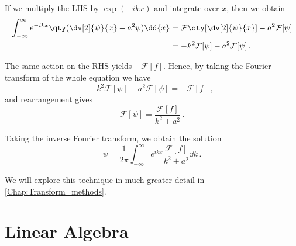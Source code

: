 \documentclass{article}
\theoremstyle{plain}\theoremheaderfont{\normalfont\itshape}\theorembodyfont{\rmfamily}\theoremseparator{.}\newtheorem*{rem}{Remark}\newtheorem*{ex}{Example}\newtheorem*{proof}{Proof}\newtheorem*{altp}{Alternative proof}
\theoremstyle{plain}\theoremheaderfont{\normalfont\bfseries}\theorembodyfont{\rmfamily}\theoremseparator{.}\newtheorem{thm}{Theorem}[section]\newtheorem{lem}[thm]{Lemma}\newtheorem{prop}[thm]{Proposition}\newtheorem*{cor}{Corollary}\newtheorem{defn}[thm]{Definition}\newtheorem{clm}[thm]{Claim}\newtheorem{clminproof}{Claim}
\theoremstyle{break}\theoremheaderfont{\normalfont\itshape}\theorembodyfont{\rmfamily}\theoremseparator{.\medskip}\newtheorem*{proofskip}{Proof}\newtheorem*{exs}{Examples}\newtheorem*{rems}{Remarks}
\theoremstyle{break}\theoremheaderfont{\normalfont\bfseries}\theorembodyfont{\rmfamily}\theoremseparator{.\medskip}\newtheorem{lemskip}[thm]{Lemma}\newtheorem{defnskip}[thm]{Definition}\newtheorem{propskip}[thm]{Proposition}\newtheorem{thmskip}[thm]{Theorem}
\numberwithin{equation}{section}
\begin{document}
	If we multiply the LHS by \(\exp(-ikx)\) and integrate over \(x\), then we obtain
	\begin{align*}
		\int_{-\infty}^{\infty}e^{-ikx}\qty(\dv[2]{\psi}{x}-a^2\psi)\dd{x}&=\mathcal{F}\qty[\dv[2]{\psi}{x}]-a^2\mathcal{F}[\psi]\\
		&=-k^2\mathcal{F}[\psi]-a^2\mathcal{F}[\psi]\,.
	\end{align*}
	
	The same action on the RHS yields \(-\mathcal{F}[f]\). Hence, by taking the Fourier transform of the whole equation we have
	\[-k^2\mathcal{F}[\psi]-a^2\mathcal{F}[\psi]=-\mathcal{F}[f]\,,\]
	and rearrangement gives
	\[\mathcal{F}[\psi]=\frac{\mathcal{F}[f]}{k^2+a^2}\,.\]
	
	Taking the inverse Fourier transform, we obtain the solution
	\[\psi=\frac{1}{2\pi}\int_{-\infty}^{\infty}e^{ikx}\frac{\mathcal{F}[f]}{k^2+a^2}\dd{k}\,.\]

	We will explore this technique in much greater detail in \cref{Chap:Transform_methods}.
	
	\newpage
	
	\section{Linear Algebra}\label{Chap:Lin_Alg}
\end{document}
